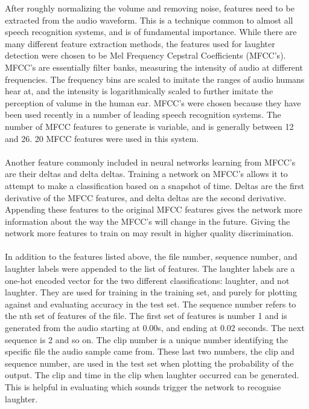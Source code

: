 \documentclass[a4paper,11pt,notitlepage]{article}
\begin{document}
After roughly normalizing the volume and removing noise, features need to be extracted from the audio waveform. This is a technique common to almost all speech recognition systems, and is of fundamental importance. While there are many different feature extraction methods, the features used for laughter detection were chosen to be Mel Frequency Cepstral Coefficients (MFCC's). MFCC's are essentially filter banks, measuring the intensity of audio at different frequencies. The frequency bins are scaled to imitate the ranges of audio humans hear at, and the intensity is logarithmically scaled to further imitate the perception of valume in the human ear. MFCC's were chosen because they have been used recently in a number of leading speech recognition systems.\cite{mozilladeepspeech} The number of MFCC features to generate is variable, and is generally between 12 and 26. 20 MFCC features were used in this system.\\
\\
Another feature commonly included in neural networks learning from MFCC's are their deltas and delta deltas. Training a network on MFCC's allows it to attempt to make a classification based on a snapshot of time. Deltas are the first derivative of the MFCC features, and delta deltas are the second derivative. Appending these features to the original MFCC features gives the network more information about the way the MFCC's will change in the future. Giving the network more features to train on may result in higher quality discrimination.\\
\\
In addition to the features listed above, the file number, sequence number, and laughter labels were appended to the list of features. The laughter labels are a one-hot encoded vector for the two different classifications: laughter, and not laughter. They are used for training in the training set, and purely for plotting against and evaluating accuracy in the test set. The sequence number refers to the nth set of features of the file. The first set of features is number 1 and is generated from the audio starting at 0.00s, and ending at 0.02 seconds. The next sequence is 2 and so on. The clip number is a unique number identifying the specific file the audio sample came from. These last two numbers, the clip and sequence number, are used in the test set when plotting the probability of the output. The clip and time in the clip when laughter occurred can be generated. This is helpful in evaluating which sounds trigger the network to recognise laughter.\\
\end{document}
